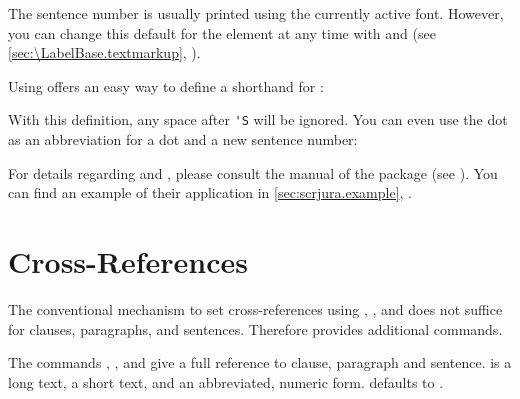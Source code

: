 %
The sentence number is usually printed
using the currently active font.  However, you can change this default for the
 element at any time with
%
 and
 (see
\autoref{sec:\LabelBase.textmarkup},
).%
%

Using  offers an easy way
to define a shorthand for :%
\label{sec:scrjura.shorthandexample}%
\begin{lstcode}[moretexcs={useshorthands,defineshorthand}]
\end{lstcode}
With this definition, any space after \lstinline|'S| will be ignored. You can
even use the dot as an abbreviation for a dot and a new sentence number:
\begin{lstcode}[moretexcs={useshorthands,defineshorthand}]
\end{lstcode}
For details regarding  and ,
please consult the manual of the  package (see
\cite{package:babel}). You can find an example of their application in
\autoref{sec:scrjura.example}, .%
\EndIndexGroup
%
\EndIndexGroup
%
\EndIndexGroup


\section{Cross-References}
\label{sec:scrjura.ref}

The conventional mechanism to set cross-references using
, , and
 does not suffice for clauses, paragraphs, and sentences.
Therefore  provides additional commands.

\begin{Declaration}
\end{Declaration}
The commands , , and  give a full
reference to clause, paragraph and sentence.  is a long text,
 a short text, and  an abbreviated, numeric form.
 defaults to .%
\EndIndexGroup


